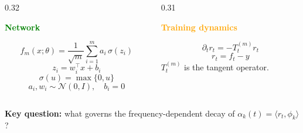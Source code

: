 \documentclass[aspectratio=169,9pt]{beamer}
\begin{document}
\begin{frame}
\begin{columns}[T,onlytextwidth]
		\begin{column}{0.32\textwidth}
			\pause
			\begin{greencard}[height=43mm]
				{\textcolor{green}{\bfseries Network}}\par\vspace{1.5mm}
				{\scriptsize
					\[
						f_m(x;\theta)
						=
						\frac{1}{\sqrt m}
						\sum_{i=1}^m
						a_i\,\sigma(z_i)
					\]
					\vspace{-2mm}
					\[
						z_i=w_i^\top x+b_i
					\]
				}
				\vspace{-1mm}
				{\scriptsize
					\[
						\sigma(u)=\max\{0,u\}
					\]
				}
				\vspace{-2mm}
				{\scriptsize
					\[
						a_i, w_i \sim \mathcal N(0,I), \quad b_i = 0
					\]
				}
			\end{greencard}
		\end{column}

		\begin{column}{0.31\textwidth}
			\pause
			\begin{orangecard}[height=43mm]
				{\textcolor{orange}{\bfseries Training dynamics}}\par\vspace{2mm}
				\[
					\partial_t r_t=-T_t^{(m)}r_t
				\]
				\vspace{-2mm}
				\[
					r_t=f_t-y
				\]
				\vspace{-1mm}
				{\centering \scriptsize $T_t^{(m)}$ is the tangent operator.}
			\end{orangecard}
		\end{column}
	\end{columns}

	\vspace{2.4mm}
	\pause
	\begin{whitecard}
		\centering
		{\bfseries Key question:} what governs the frequency-dependent decay of $\alpha_k(t)=\langle r_t,\phi_k\rangle$?
	\end{whitecard}
\end{frame}
\end{document}
